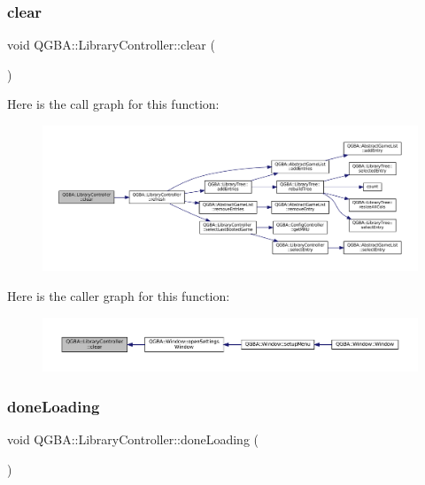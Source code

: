 \subsubsection{\texorpdfstring{clear}{clear}}
{\footnotesize\ttfamily void Q\+G\+B\+A\+::\+Library\+Controller\+::clear (\begin{DoxyParamCaption}{ }\end{DoxyParamCaption})\hspace{0.3cm}{\ttfamily [slot]}}

Here is the call graph for this function\+:
\nopagebreak
\begin{figure}[H]
\begin{center}
\leavevmode
\includegraphics[width=350pt]{class_q_g_b_a_1_1_library_controller_a71ee6910dd69a573702798a708f7d378_cgraph}
\end{center}
\end{figure}
Here is the caller graph for this function\+:
\nopagebreak
\begin{figure}[H]
\begin{center}
\leavevmode
\includegraphics[width=350pt]{class_q_g_b_a_1_1_library_controller_a71ee6910dd69a573702798a708f7d378_icgraph}
\end{center}
\end{figure}
\mbox{\label{class_q_g_b_a_1_1_library_controller_a5e615220cf4daf6560b4b15eb61d0298}} 
\subsubsection{\texorpdfstring{done\+Loading}{doneLoading}}
{\footnotesize\ttfamily void Q\+G\+B\+A\+::\+Library\+Controller\+::done\+Loading (\begin{DoxyParamCaption}{ }\end{DoxyParamCaption})\hspace{0.3cm}{\ttfamily [signal]}}

